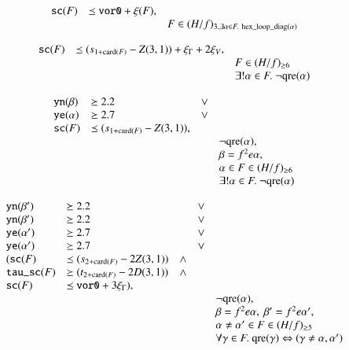 \begin{equation}  %
    \begin{array}{lll}
    \optt{sc}(F) &\sle \optt{vor0} + \xi(F),\\
    &&F\in (H/f)_{3,\exists\alpha\in F.\ \op{hex\_loop\_diag}(\alpha)}
    \end{array}
\end{equation}

\begin{equation}  %
    \begin{array}{lll}
    \optt{sc}(F) & \sle (s_{1+\card(F)} - Z(3,1)) + \xi_\Gamma + 2 \xi_V,\\
    &&F\in (H/f)_{\ge6}\\
    &&\exists!\alpha\in F.\ \neg\op{qre}(\alpha)
    \end{array}
\end{equation}

\begin{equation}  %
    \begin{array}{llll}
    \optt{yn}(\beta)&\sge 2.2&\vee\\
    \optt{ye}(\alpha)&\sge 2.7&\vee\\
    \optt{sc}(F) & \sle (s_{1+\card(F)} - Z(3,1)),\\
    &&&\neg\op{qre}(\alpha),\\
    &&&\beta=f^2e\alpha,\\
    &&&\alpha\in F\in (H/f)_{\ge6}\\
    &&&\exists!\alpha\in F.\ \neg\op{qre}(\alpha)
    \end{array}
\end{equation}

\begin{equation}
    \begin{array}{lllll}
    {\operatorname{{\texttt{yn}}}}(\beta')&\succeq 2.2&&\vee\\
    {\operatorname{{\texttt{yn}}}}(\beta')&\succeq 2.2&&\vee\\
    {\operatorname{{\texttt{ye}}}}(\alpha')&\succeq 2.7&&\vee\\
        {\operatorname{{\texttt{ye}}}}(\alpha')&\succeq 2.7&&\vee\\
    ({\operatorname{{\texttt{sc}}}}(F) & \preceq (s_{2+{\operatorname{card}}(F)} - 2 Z(3,1))&\wedge \\
    {\operatorname{{\texttt{tau\_sc}}}}(F) & \succeq (t_{2+{\operatorname{card}}(F)} - 2 D(3,1))&\wedge \\
    {\operatorname{{\texttt{sc}}}}(F) & \preceq {\operatorname{{\texttt{vor0}}}} + 3\xi_\Gamma), \\
    &&&&\neg{\operatorname{qre}}(\alpha),\\
    &&&&\beta=f^2e\alpha,\ \beta'=f^2e\alpha',\\
    &&&&\alpha\ne\alpha'\in F\in (H/f)_{\ge5}\\
    &&&&\forall\gamma\in F.\ {\operatorname{qre}}(\gamma)\Leftrightarrow (\gamma\ne\alpha,\alpha')\\
    \end{array}
\end{equation}

